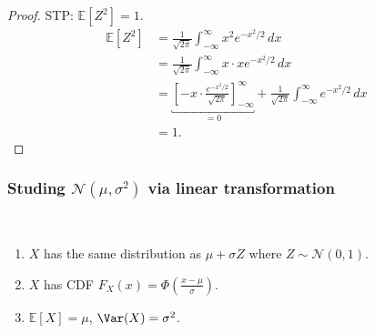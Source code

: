 \begin{proof}
    STP: $\mathbb{E}[Z^2] = 1$.
    \begin{align*}
        \mathbb{E}[Z^2] &= \frac{1}{\sqrt{2 \pi}} \int_{-\infty}^{\infty} x^2 e^{-x^2 / 2} \,dx \\
        &= \frac{1}{\sqrt{2 \pi}} \int_{-\infty}^{\infty} x \cdot x e^{-x^2 / 2} \,dx \\
        &= \underbracket{\left[ -x \cdot \frac{e^{-x^2 / 2}}{\sqrt{2 \pi}} \right]^\infty_{- \infty}}_{= 0} + \frac{1}{\sqrt{2 \pi}} \int_{-\infty}^{\infty} e^{-x^2 / 2} \,dx \\
        &= 1.
    \end{align*}
\end{proof} 

\subsubsection{Studing $\mathcal{N}(\mu, \sigma^2)$ via linear transformation}

\begin{claim} ~\vspace*{-1.5\baselineskip}
     \begin{enumerate}
         \item $X$ has the same distribution as $\mu + \sigma Z$ where $Z \sim \mathcal{N}(0, 1)$.
         \item $X$ has CDF $F_X(x) = \Phi \left( \frac{x - \mu}{\sigma} \right)$.
         \item $\mathbb{E}[X] = \mu$, $\Var(X) = \sigma^2$.
     \end{enumerate} 
\end{claim} 

